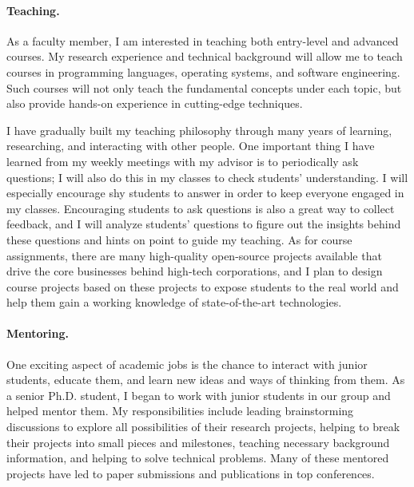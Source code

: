\documentclass[10pt]{article}
\begin{document}
\vspace{-0.1in}
\paragraph*{Teaching.}
As a faculty member, I am interested in teaching both entry-level and advanced courses. My research experience and technical background will allow me to teach courses in programming languages, operating systems, and software engineering. Such courses will not only teach the fundamental concepts under each topic, but also provide hands-on experience in cutting-edge techniques.

I have gradually built my teaching philosophy through many years of learning, researching, and interacting with other people. 
One important thing I have learned from my weekly meetings with my advisor is to periodically ask questions; I will also do this in my classes to check students' understanding. 
I will especially encourage shy students to answer in order to keep everyone engaged in my classes. 
Encouraging students to ask questions is also a great way to collect feedback, and I will analyze students' questions to figure out the insights behind these questions and
hints on point to guide my teaching. 
As for course assignments, there are many high-quality open-source projects
available that drive the core businesses behind high-tech corporations, and I plan to design course projects 
based on these projects to expose students to the real world and help them gain a working knowledge of state-of-the-art technologies.


\vspace{-0.1in}
\paragraph*{Mentoring.}
One exciting aspect of academic jobs is the chance to interact with junior students, educate them, and learn new ideas and ways of thinking from them. 
As a senior Ph.D. student, I began to work with junior students in
our group and helped mentor them. 
My responsibilities include leading brainstorming discussions to explore all
possibilities of their research projects, helping to break their projects into small pieces and milestones, 
teaching necessary background information, and helping to solve technical problems. 
Many of these mentored projects have
led to paper submissions and publications in top conferences.
\end{document}
